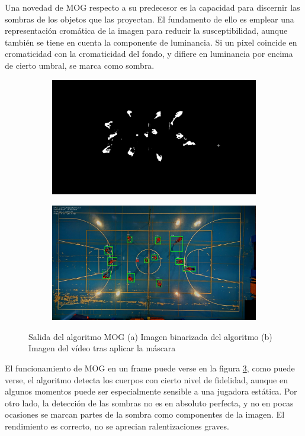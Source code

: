Una novedad de MOG respecto a su predecesor es la capacidad para discernir las sombras de los objetos que las proyectan. El fundamento de ello es emplear una representación cromática de la imagen para reducir la susceptibilidad, aunque también se tiene en cuenta la componente de luminancia. Si un pixel coincide en cromaticidad con la cromaticidad del fondo, y difiere en luminancia por encima de cierto umbral, se marca como sombra.

\begin{figure}
\begin{subfigure}{.5\textwidth}
  \centering
  \includegraphics[width=.9\linewidth]{images/MOGsub}
  \caption { }
  \label{fig:MOG1a}
\end{subfigure}%
\begin{subfigure}{.5\textwidth}
  \centering
  \includegraphics[width=.9\linewidth]{images/MOG}
  \caption { }
  \label{fig:MOG1b}
\end{subfigure}
\caption{Salida del algoritmo MOG (a) Imagen binarizada del algoritmo (b) Imagen del vídeo tras aplicar la máscara}
\label{fig:MOG}
\end{figure}

El funcionamiento de MOG en un frame puede verse en la figura \ref{fig:MOG}, como puede verse, el algoritmo detecta los cuerpos con cierto nivel de fidelidad, aunque en algunos momentos puede ser especialmente sensible a una jugadora estática. Por otro lado, la detección de las sombras no es en absoluto perfecta, y no en pocas ocasiones se marcan partes de la sombra como componentes de la imagen. El rendimiento es correcto, no se aprecian ralentizaciones graves.

